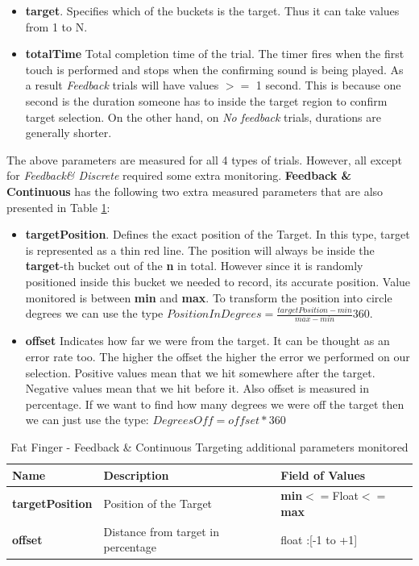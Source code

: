 \begin{itemize}
	\item \textbf{target}. Specifies which of the buckets is the target. Thus it can take values from 1 to N.
	
	\item \textbf{totalTime} Total completion time of the trial. The timer fires when the first touch is performed and stops when the confirming sound is being played. As a result \emph{Feedback} trials will have values $>=$ 1 second. This is because one second is the duration  someone has to inside the target region to confirm target selection. On the other hand, on \emph{No feedback} trials, durations are generally shorter.
\end{itemize}



The above parameters are measured for all 4 types of trials. However, all except for \emph{Feedback\& Discrete} required some extra monitoring. \textbf{Feedback \& Continuous} has the following two extra measured parameters that are also presented in Table \ref{tab:ffFNDData}:

\begin{itemize}
	\item \textbf{targetPosition}. Defines the exact position of the Target. In this type, target is represented as a thin red line. The position will always be inside the \textbf{target}-th bucket out of the \textbf{n} in total. However since it is randomly positioned inside this bucket we needed to record, its accurate position. Value monitored is between \textbf{min} and \textbf{max}. To transform the position into circle degrees we can use the type $PositionInDegrees = \frac{targetPosition-min}{max-min}360$.
	\item \textbf{offset} Indicates how far we were from the target. It can be thought as an error rate too. The higher the offset the higher the error we performed on our selection. Positive values mean that we hit somewhere after the target. Negative values mean that we hit before it. Also offset is measured in percentage. If we want to find how many degrees we were off the target then we can just use the type: $DegreesOff = offset*360$
\end{itemize}


\begin{table}[H]
\centering
\begin{tabular}{l || l || l}
Name & Description & Field of Values \\
\hline \hline
\textbf{targetPosition} & Position of the Target & \textbf{min}$<=$Float$<=$\textbf{max} \\
\textbf{offset} & Distance from target in percentage & float :[-1 to +1] 
\end{tabular}
\caption{Fat Finger - Feedback \& Continuous Targeting additional parameters monitored}
\label{tab:ffFNDData}
\end{table}


